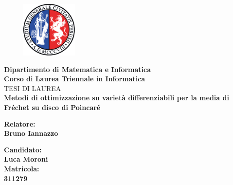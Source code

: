 \documentclass[a4paper, 12pt]{article}
\begin{document}
\begin{titlepage} %
\begin{figure}[t] %
    \centering\includegraphics[width=0.25\textwidth]{logo_unipg}
\end{figure}
\vspace{20mm}

\begin{Large}
 \begin{center}
	\textbf{Dipartimento di Matematica e Informatica\\ Corso di Laurea Triennale in Informatica\\}
	\vspace{20mm}
    {\LARGE{TESI DI LAUREA}}\\
	\vspace{10mm}
	{\huge{\bf Metodi di ottimizzazione su varietà differenziabili per la media di Fréchet su disco di Poincaré}}\\
\end{center}
\end{Large}

\vspace{30mm}
\begin{minipage}[t]{0.47\textwidth}
	{\large{\bf Relatore:\\ Bruno Iannazzo}}
\end{minipage}
\hfill
\begin{minipage}[t]{0.47\textwidth}\raggedleft
	{\large{\bf Candidato: \\ Luca Moroni\\ }}
	\vspace{5mm}
	{\large{\bf Matricola: \\ 311279\\ }}
\end{minipage}

\vspace{25mm}

\hrulefill

\vspace{5mm}


\end{titlepage}
\end{document}
